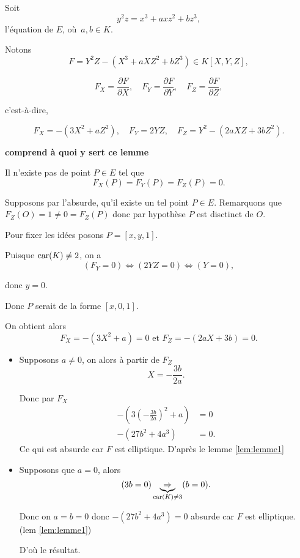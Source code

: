 Soit 
\[
y^2z = x^3 + axz^2 + bz^3
,\] l'équation de $E$, où $a,b \in K$.

Notons
\[
    F = Y^2Z - \left( X^3 + aXZ^2 + bZ^3 \right) \in K[X,Y,Z]
,\] 

\[
F_{X} = \frac{\partial F}{\partial X},\quad F_{Y} = \frac{\partial F}{\partial Y},\quad F_{Z} = \frac{\partial F}{\partial Z}
,\] 

c'est-à-dire, 

\[
F_{X} = - \left( 3X^2 + aZ^2 \right),\quad F_{Y} = 2YZ,\quad F_{Z} = Y^2 - \left( 2aXZ + 3bZ^2 \right)
.\] 

\textbf{comprend à quoi y sert ce lemme}
\begin{lemme}
    \label{lem:lemme3}
    
    Il n'existe pas de point $P \in E$ tel que
    \[
    F_{X}(P) = F_{Y}(P) = F_{Z}(P) = 0
    .\] 
\end{lemme}

\begin{demonstration}
   Supposons par l'absurde, qu'il existe un tel point $P \in E$. Remarquons que $F_{Z}(O) = 1 \neq 0 = F_{Z}(P)$ donc par hypothèse $P$ est disctinct de $O$.

   Pour fixer les idées posons $P = [x,y,1]$.

   Puisque $\operatorname{car}(K) \neq 2$, on a
   \[
       (F_{Y} = 0) \iff (2YZ = 0) \iff (Y = 0) 
   ,\] 

   donc $y = 0$.
   
   Donc $P$ serait de la forme $[x,0,1]$.
   
   On obtient alors
   \[
   F_{X} = - \left( 3X^2 + a \right) = 0 \text{ et } F_{Z} = -\left( 2aX + 3b \right) = 0
   .\] 
   
   \begin{itemize}
       \item Supposons $a \neq 0$, on alors à partir de $F_{Z}$
   \[
       X = - \frac{3b}{2a} 
   .\] 

   Donc par $F_{X}$
\begin{align*}
    - \left( 3 (- \frac{3b}{2a})^2 + a \right) &= 0 \\
    - \left( 27b^2 + 4a^3 \right) &= 0
.\end{align*}
Ce qui est absurde car $F$ est elliptique. D'après le lemme \ref{lem:lemme1}
        \item Supposons que $a = 0$, alors
            \[
                (3b = 0) \underbrace{\Rightarrow}_{\operatorname{car}(K) \neq 3} (b = 0)
            .\] 

            Donc on $a = b = 0$ donc $-\left( 27b^2 + 4a^3 \right) = 0$ absurde car $F$ est elliptique. (lem \ref{lem:lemme1})

            D'où le résultat.
   \end{itemize}
\end{demonstration}

